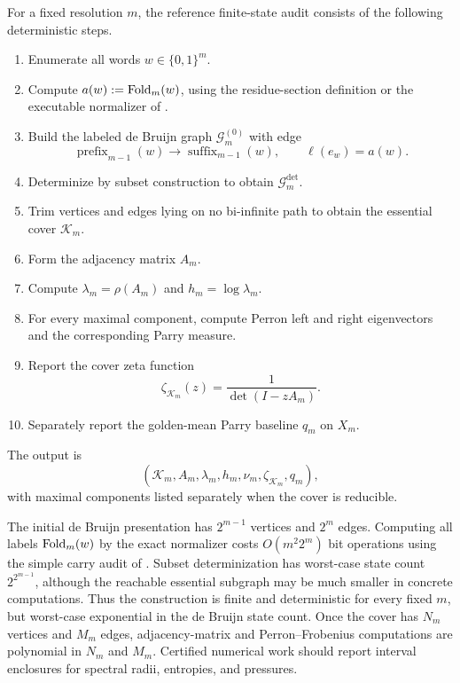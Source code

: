 \begin{definition}
\label{def:reference-finite-state-audit}
For a fixed resolution \(m\), the reference finite-state audit consists of the following deterministic steps.
\begin{enumerate}[label=(B\arabic*)]
\item Enumerate all words \(w\in\{0,1\}^m\).
\item Compute \(a(w):=\operatorname{Fold}_m(w)\), using the residue-section definition or the executable normalizer of .
\item Build the labeled de Bruijn graph \(\mathcal G_m^{(0)}\) with edge
\[
\operatorname{prefix}_{m-1}(w)\to \operatorname{suffix}_{m-1}(w),
\qquad
\ell(e_w)=a(w).
\]
\item Determinize by subset construction to obtain \(\mathcal G_m^{\det}\).
\item Trim vertices and edges lying on no bi-infinite path to obtain the essential cover \(\mathcal K_m\).
\item Form the adjacency matrix \(A_m\).
\item Compute \(\lambda_m=\rho(A_m)\) and \(h_m=\log\lambda_m\).
\item For every maximal component, compute Perron left and right eigenvectors and the corresponding Parry measure.
\item Report the cover zeta function
\[
\zeta_{\mathcal K_m}(z)=\frac1{\det(I-zA_m)}.
\]
\item Separately report the golden-mean Parry baseline \(q_m\) on \(X_m\).
\end{enumerate}
The output is
\[
\left(\mathcal K_m,A_m,\lambda_m,h_m,\nu_m,\zeta_{\mathcal K_m},q_m\right),
\]
with maximal components listed separately when the cover is reducible.
\end{definition}

The initial de Bruijn presentation has \(2^{m-1}\) vertices and \(2^m\) edges.  Computing all labels \(\operatorname{Fold}_m(w)\) by the exact normalizer costs \(O(m^2 2^m)\) bit operations using the simple carry audit of .  Subset determinization has worst-case state count \(2^{2^{m-1}}\), although the reachable essential subgraph may be much smaller in concrete computations.  Thus the construction is finite and deterministic for every fixed \(m\), but worst-case exponential in the de Bruijn state count.  Once the cover has \(N_m\) vertices and \(M_m\) edges, adjacency-matrix and Perron--Frobenius computations are polynomial in \(N_m\) and \(M_m\).  Certified numerical work should report interval enclosures for spectral radii, entropies, and pressures.

